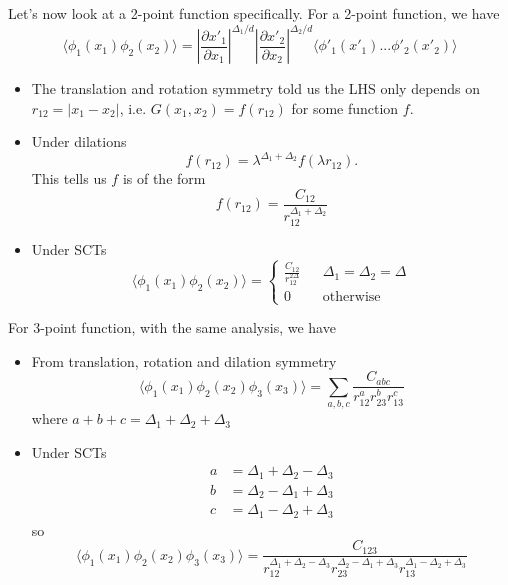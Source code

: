 \documentclass[a4paper,11pt]{article}
\begin{document}
Let's now look at a 2-point function specifically. For a 2-point function, we have \begin{equation}
     \langle\phi_{1}(x_1)\phi_{2}(x_2)\rangle=\left|\frac{\partial x'_1}{\partial x_1}\right|^{\Delta_{1}/d}\left|\frac{\partial x'_2}{\partial x_2}\right|^{\Delta_{2}/d} \langle\phi'_{1}(x'_1)...\phi'_{2}(x'_2)\rangle
\end{equation}
\begin{itemize}
    \item The translation and rotation symmetry told us the LHS only depends on $r_{12}=\left|x_1-x_2\right|$, i.e. $G(x_1,x_2)=f(r_{12})$ for some function $f$.
    \item Under dilations
    \begin{equation*}
        f(r_{12})=\lambda^{\Delta_1+\Delta_2}f(\lambda r_{12}).
    \end{equation*}
    This tells us $f$ is of the form 
    \begin{equation*}
        f(r_{12})=\frac{C_{12}}{r_{12}^{\Delta_1+\Delta_2}}
    \end{equation*}
    \item Under SCTs
    \begin{equation}
        \langle\phi_1(x_1)\phi_2(x_2)\rangle=\left\{\begin{aligned}\frac{C_{12}}{r_{12}^{2\Delta}}&&\Delta_1=\Delta_2=\Delta\\0 &&\mathrm{otherwise}
    \end{aligned}\right.\end{equation}
\end{itemize}

For 3-point function, with the same analysis, we have
\begin{itemize}
    \item From translation, rotation and dilation symmetry
    \begin{equation*}
        \langle\phi_1(x_1)\phi_2(x_2)\phi_3(x_3)\rangle=\sum_{a,b,c}\frac{C_{abc}}{r_{12}^ar_{23}^br_{13}^c}
    \end{equation*}
    where $a+b+c=\Delta_1+\Delta_2+\Delta_3$
    \item Under SCTs 
    \begin{equation*}
        \begin{aligned}
            a&=\Delta_1+\Delta_2-\Delta_3\\
            b&=\Delta_2-\Delta_1+\Delta_3\\
            c&=\Delta_1-\Delta_2+\Delta_3
        \end{aligned}
    \end{equation*}
    so
    \begin{equation*}
        \langle\phi_1(x_1)\phi_2(x_2)\phi_3(x_3)\rangle=\frac{C_{123}}{r_{12}^{\Delta_1+\Delta_2-\Delta_3}r_{23}^{\Delta_2-\Delta_1+\Delta_3}r_{13}^{\Delta_1-\Delta_2+\Delta_3}}
    \end{equation*}
\end{itemize}
\end{document}
